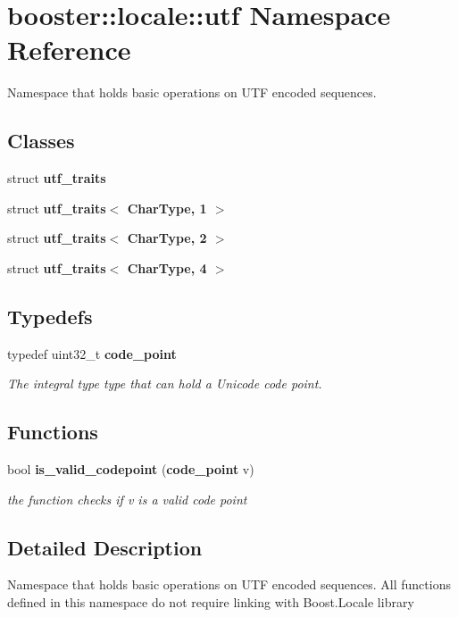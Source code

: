 \section{booster\-:\-:locale\-:\-:utf Namespace Reference}
\label{namespacebooster_1_1locale_1_1utf}


Namespace that holds basic operations on U\-T\-F encoded sequences.  


\subsection*{Classes}
\begin{DoxyCompactItemize}
\item 
struct {\bf utf\-\_\-traits}
\item 
struct {\bf utf\-\_\-traits$<$ Char\-Type, 1 $>$}
\item 
struct {\bf utf\-\_\-traits$<$ Char\-Type, 2 $>$}
\item 
struct {\bf utf\-\_\-traits$<$ Char\-Type, 4 $>$}
\end{DoxyCompactItemize}
\subsection*{Typedefs}
\begin{DoxyCompactItemize}
\item 
typedef uint32\-\_\-t {\bf code\-\_\-point}\label{namespacebooster_1_1locale_1_1utf_a99fa30e51629ed1d20e5989b9f36effc}

\begin{DoxyCompactList}\small\item\em The integral type type that can hold a Unicode code point. \end{DoxyCompactList}\end{DoxyCompactItemize}
\subsection*{Functions}
\begin{DoxyCompactItemize}
\item 
bool {\bf is\-\_\-valid\-\_\-codepoint} ({\bf code\-\_\-point} v)\label{namespacebooster_1_1locale_1_1utf_a75c67e9ea9fa30bade54917264b1a19b}

\begin{DoxyCompactList}\small\item\em the function checks if {\itshape v} is a valid code point \end{DoxyCompactList}\end{DoxyCompactItemize}


\subsection{Detailed Description}
Namespace that holds basic operations on U\-T\-F encoded sequences. All functions defined in this namespace do not require linking with Boost.\-Locale library 